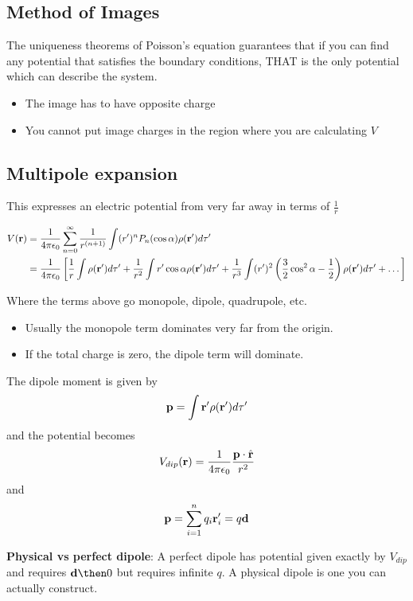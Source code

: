 \documentclass{article}
\newcommand{\vh}[1]{\hat{\vb{#1}}}
\newcommand{\ck}{\frac{1}{4\pi\epsilon_0}}
\begin{document}
\subsection{Method of Images}
The uniqueness theorems of Poisson's equation guarantees that if you can find any potential that satisfies the boundary conditions, THAT is the only potential which can describe the system.

\begin{itemize}
\item The image has to have opposite charge
\item You cannot put image charges in the region where you are calculating $V$
\end{itemize}

\subsection{Multipole expansion}

This expresses an electric potential from very far away in terms of $\frac{1}{r}$

\begin{align*}
V(\vb{r}) & = \ck \sum_{n=0}^{\infty} \frac{1}{r^{(n+1)}} \int (r')^n P_n (\cos\alpha)\rho(\vb{r}') d\tau'\\
& = \ck \left[ \frac{1}{r} \int \rho(\vb{r}')d\tau' + \frac{1}{r^2} \int r' \cos \alpha \rho(\vb{r}') d\tau' + \frac{1}{r^3}\int(r')^2 \left(\frac{3}{2} \cos^2 \alpha - \frac{1}{2} \right) \rho(\vb{r}') d\tau' + \dots \right]
\end{align*}

Where the terms above go monopole, dipole, quadrupole, etc.

\begin{itemize}
    \item Usually the monopole term dominates very far from the origin.
    \item If the total charge is zero, the dipole term will dominate.
\end{itemize}

The dipole moment is given by 
$$
\vb{p} = \int \vb{r}' \rho(\vb{r}') d\tau'
$$
and the potential becomes
$$
V_{dip}(\vb{r}) = \ck \frac{\vb{p} \cdot \vh{r}}{r^2}
$$
and
$$
\vb{p} = \sum_{i=1}^n q_i \vb{r}'_i = q\vb{d}
$$

\textbf{Physical vs perfect dipole}: A perfect dipole has potential given exactly by $V_{dip}$ and requires $\vb{d} \then 0$ but requires infinite $q$.  A physical dipole is one you can actually construct.
\end{document}
